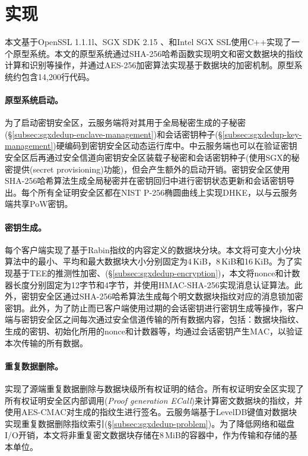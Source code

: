 \section{\sysnameS 实现}
\label{sec:sgxdedup-implementation}

本文基于OpenSSL 1.1.1l\cite{openssl}、SGX SDK 2.15\cite{sgxsdk} 、和Intel SGX SSL\cite{sgxssl}使用C++实现了一个\sysnameS 原型系统。本文的原型系统通过SHA-256哈希函数实现明文和密文数据块的指纹计算和识别等操作，并通过AES-256加密算法实现基于数据块的加密机制。原型系统约包含14,200行代码。

\paragraph*{原型系统启动。}
为了启动密钥安全区，云服务端将对其用于全局秘密生成的子秘密(\S\ref{subsec:sgxdedup-enclave-management})和会话密钥种子(\S\ref{subsec:sgxdedup-key-management})硬编码到密钥安全区动态运行库中。\sysnameS 中云服务端也可以在验证密钥安全区后再通过安全信道向密钥安全区装载子秘密和会话密钥种子(使用SGX\cite{sgx}的秘密提供(secret provisioning)功能)，但会产生额外的启动开销。密钥安全区使用SHA-256哈希算法生成全局秘密并在密钥回归中进行密钥状态更新和会话密钥导出。每个所有全证明安全区都在NIST P-256椭圆曲线\cite{nist}上实现DHKE，以与云服务端共享PoW密钥。

\paragraph*{密钥生成。}每个客户端实现了基于Rabin指纹\cite{rabin81}的内容定义的数据块分块。本文将可变大小分块算法中的最小、平均和最大数据块大小分别固定为4\,KiB，8\,KiB和16\,KiB。为了实现基于TEE的推测性加密、(\S\ref{subsec:sgxdedup-encryption})，本文将nonce和计数器长度分别固定为12字节和4字节，并使用HMAC-SHA-256实现消息认证算法。此外，密钥安全区通过SHA-256哈希算法生成每个明文数据块指纹对应的消息锁加密密钥。此外，为了防止而已客户端使用过期的会话密钥进行密钥生成等操作，客户端与密钥安全区之间每次通过安全信道传输的所有数据内容，包括：数据块指纹、生成的密钥、初始化所用的nonce和计数器等，均通过会话密钥产生MAC，以验证本次传输的所有数据。

\paragraph*{重复数据删除。}\sysnameS 实现了源端重复数据删除与数据块级所有权证明的结合。所有权证明安全区实现了所有权证明安全区内部调用(\textit{Proof generation ECall})来计算密文数据块的指纹，并使用AES-CMAC对生成的指纹生进行签名。云服务端基于LevelDB\cite{leveldb}键值对数据块实现重复数据删除指纹索引(\S\ref{subsec:sgxdedup-problem})。为了降低网络和磁盘I/O开销，本文将非重复密文数据块存储在8\,MiB的容器中，作为传输和存储的基本单位\cite{lillibridge13}。

